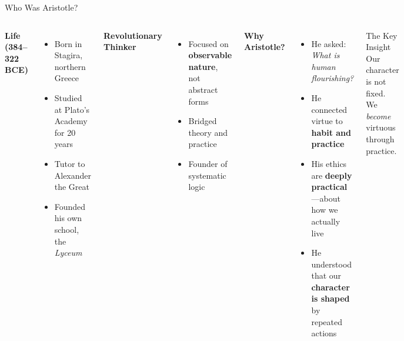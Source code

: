 \documentclass[aspectratio=169]{beamer}
\begin{document}
\begin{frame}{Who Was Aristotle?}
\begin{columns}[T]
\textbf{Life (384--322 BCE)}
\begin{itemize}
    \item Born in Stagira, northern Greece
    \item Studied at Plato's Academy for 20 years
    \item Tutor to Alexander the Great
    \item Founded his own school, the \textit{Lyceum}
\end{itemize}

\vspace{0.3cm}
\textbf{Revolutionary Thinker}
\begin{itemize}
    \item Focused on \textbf{observable nature}, not abstract forms
    \item Bridged theory and practice
    \item Founder of systematic logic
\end{itemize}

\textbf{Why Aristotle?}
\begin{itemize}
    \item He asked: \textit{What is human flourishing?}
    \item He connected virtue to \textbf{habit and practice}
    \item His ethics are \textbf{deeply practical}---about how we actually live
    \item He understood that our \textbf{character is shaped} by repeated actions
\end{itemize}

\vspace{0.3cm}
\begin{alertblock}{The Key Insight}
Our character is not fixed. We \textit{become} virtuous through practice.
\end{alertblock}
\end{columns}
\end{frame}
\end{document}
